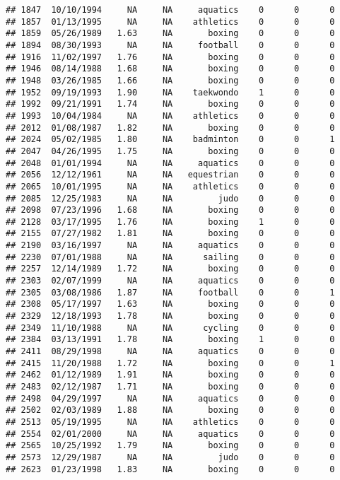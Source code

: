 \documentclass[]{article}
\begin{document}
\begin{verbatim}
## 1847  10/10/1994     NA     NA     aquatics    0      0      0
## 1857  01/13/1995     NA     NA    athletics    0      0      0
## 1859  05/26/1989   1.63     NA       boxing    0      0      0
## 1894  08/30/1993     NA     NA     football    0      0      0
## 1916  11/02/1997   1.76     NA       boxing    0      0      0
## 1946  08/14/1988   1.68     NA       boxing    0      0      0
## 1948  03/26/1985   1.66     NA       boxing    0      0      0
## 1952  09/19/1993   1.90     NA    taekwondo    1      0      0
## 1992  09/21/1991   1.74     NA       boxing    0      0      0
## 1993  10/04/1984     NA     NA    athletics    0      0      0
## 2012  01/08/1987   1.82     NA       boxing    0      0      0
## 2024  05/02/1985   1.80     NA    badminton    0      0      1
## 2047  04/26/1995   1.75     NA       boxing    0      0      0
## 2048  01/01/1994     NA     NA     aquatics    0      0      0
## 2056  12/12/1961     NA     NA   equestrian    0      0      0
## 2065  10/01/1995     NA     NA    athletics    0      0      0
## 2085  12/25/1983     NA     NA         judo    0      0      0
## 2098  07/23/1996   1.68     NA       boxing    0      0      0
## 2128  03/17/1995   1.76     NA       boxing    1      0      0
## 2155  07/27/1982   1.81     NA       boxing    0      0      0
## 2190  03/16/1997     NA     NA     aquatics    0      0      0
## 2230  07/01/1988     NA     NA      sailing    0      0      0
## 2257  12/14/1989   1.72     NA       boxing    0      0      0
## 2303  02/07/1999     NA     NA     aquatics    0      0      0
## 2305  03/08/1986   1.87     NA     football    0      0      1
## 2308  05/17/1997   1.63     NA       boxing    0      0      0
## 2329  12/18/1993   1.78     NA       boxing    0      0      0
## 2349  11/10/1988     NA     NA      cycling    0      0      0
## 2384  03/13/1991   1.78     NA       boxing    1      0      0
## 2411  08/29/1998     NA     NA     aquatics    0      0      0
## 2415  11/20/1988   1.72     NA       boxing    0      0      1
## 2462  01/12/1989   1.91     NA       boxing    0      0      0
## 2483  02/12/1987   1.71     NA       boxing    0      0      0
## 2498  04/29/1997     NA     NA     aquatics    0      0      0
## 2502  02/03/1989   1.88     NA       boxing    0      0      0
## 2513  05/19/1995     NA     NA    athletics    0      0      0
## 2554  02/01/2000     NA     NA     aquatics    0      0      0
## 2565  10/25/1992   1.79     NA       boxing    0      0      0
## 2573  12/29/1987     NA     NA         judo    0      0      0
## 2623  01/23/1998   1.83     NA       boxing    0      0      0

\end{verbatim}
\end{document}
